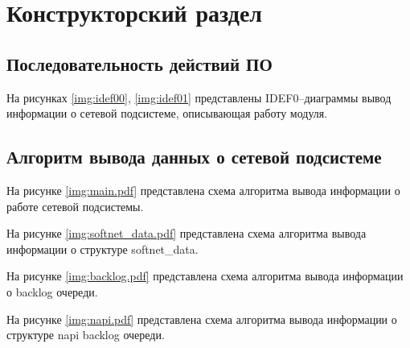 \chapter{Конструкторский раздел}

\section{Последовательность действий ПО}

На рисунках \ref{img:idef00}, \ref{img:idef01} представлены IDEF0--диаграммы вывод информации о сетевой подсистеме, описывающая работу модуля.

\FloatBarrier

\FloatBarrier

\section{Алгоритм вывода данных о сетевой подсистеме}

На рисунке \ref{img:main.pdf} представлена схема алгоритма вывода информации о работе сетевой подсистемы.

\FloatBarrier

На рисунке \ref{img:softnet_data.pdf} представлена схема алгоритма вывода информации о структуре softnet\_data.

\FloatBarrier

На рисунке \ref{img:backlog.pdf} представлена схема алгоритма вывода информации о backlog очереди.

\FloatBarrier

На рисунке \ref{img:napi.pdf} представлена схема алгоритма вывода информации о структуре napi backlog очереди.

